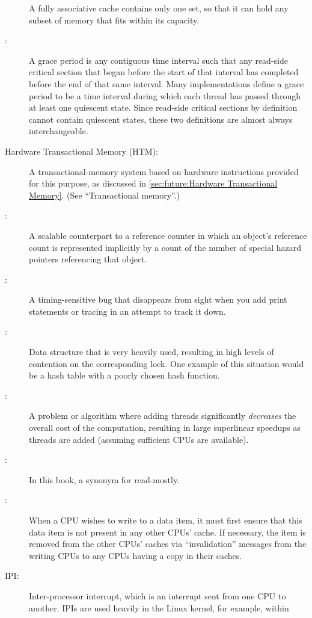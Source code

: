 \begin{description}
	A fully associative cache contains only
	one set, so that it can hold any subset of
	memory that fits within its capacity.
\item[\IXG{Grace Period}:]
	A grace period is any contiguous time interval such that
	any  read-side critical section that began before the
	start of that interval has
	completed before the end of that same interval.
	Many  implementations define a grace period to be a
	time interval during which each thread has passed through at
	least one quiescent state.
	Since  read-side critical sections by definition cannot
	contain quiescent states, these two definitions are almost
	always interchangeable.
\item[Hardware Transactional Memory (HTM):]
	A transactional-memory system based on hardware instructions
	provided for this purpose, as discussed in
	\cref{sec:future:Hardware Transactional Memory}.
	(See ``Transactional memory''.)
\item[\IXG{Hazard Pointer}:]
	A scalable counterpart to a reference counter in which an
	object's reference count is represented implicitly by a count
	of the number of special hazard pointers referencing that object.
\item[\IXG{Heisenbug}:]
	A timing-sensitive bug that disappears from sight when you
	add print statements or tracing in an attempt to track it
	down.
\item[\IXG{Hot Spot}:]
	Data structure that is very heavily used, resulting in high
	levels of contention on the corresponding lock.
	One example of this situation would be a hash table with
	a poorly chosen hash function.
\item[\IXG{Humiliatingly Parallel}:]
	A problem or algorithm where adding threads significantly
	\emph{decreases} the overall cost of the computation, resulting in
	large superlinear speedups as threads are added (assuming sufficient
	CPUs are available).
\item[\IXG{Immutable}:]
	In this book, a synonym for read-mostly.
\item[\IXG{Invalidation}:]
	When a CPU wishes to write to a data item, it must first ensure
	that this data item is not present in any other CPUs' cache.
	If necessary, the item is removed from the other CPUs' caches
	via ``invalidation'' messages from the writing CPUs to any
	CPUs having a copy in their caches.
\item[IPI:]
	Inter-processor interrupt, which is an
	interrupt sent from one CPU to another.
	IPIs are used heavily in the Linux kernel, for example, within

\end{description}
